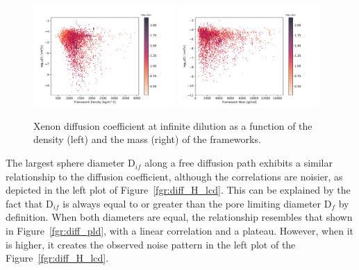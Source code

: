 \documentclass[main]{subfiles}
\begin{document}
\begin{figure}[ht]
  \centering
    \includegraphics[width=0.48\textwidth]{figures/5-diffusion/D_log-density_s_+.pdf}
    \includegraphics[width=0.48\textwidth]{figures/5-diffusion/D_log-mass_s_+.pdf}
    \caption{Xenon diffusion coefficient at infinite dilution as a function of the density (left) and the mass (right) of the frameworks. }\label{fgr:diff_density_mass}
\end{figure}

The largest sphere diameter D$_{if}$ along a free diffusion path exhibits a similar relationship to the diffusion coefficient, although the correlations are noisier, as depicted in the left plot of Figure~\ref{fgr:diff_H_lcd}. This can be explained by the fact that D$_{if}$ is always equal to or greater than the pore limiting diameter D$_{f}$ by definition. When both diameters are equal, the relationship resembles that shown in Figure~\ref{fgr:diff_pld}, with a linear correlation and a plateau. However, when it is higher, it creates the observed noise pattern in the left plot of the Figure~\ref{fgr:diff_H_lcd}. 
\end{document}
